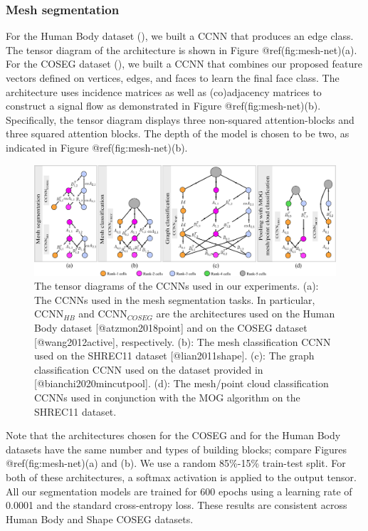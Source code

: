 \documentclass[
  12pt,
]{krantz}
\begin{document}
\subsubsection{Mesh segmentation}\label{mesh-segmentation}

For the Human Body dataset (), we built a CCNN that produces an edge class. The tensor
diagram of the architecture is shown in Figure @ref(fig:mesh-net)(a).
For the COSEG dataset (), we built a CCNN that combines our proposed feature vectors
defined on vertices, edges, and faces to learn the final face class. The
architecture uses incidence matrices as well as (co)adjacency matrices
to construct a signal flow as demonstrated in Figure
@ref(fig:mesh-net)(b). Specifically, the tensor diagram displays three
non-squared attention-blocks and three squared attention blocks. The
depth of the model is chosen to be two, as indicated in Figure
@ref(fig:mesh-net)(b).

\begin{figure}

{\centering \includegraphics{figures/experiment} 

}

\caption{The tensor diagrams of the CCNNs used in our experiments. (a): The CCNNs used in the mesh segmentation tasks. In particular, $\mbox{CCNN}_{HB}$ and $\mbox{CCNN}_{COSEG}$ are the architectures used on the Human Body dataset [@atzmon2018point] and on the COSEG dataset [@wang2012active], respectively. (b): The mesh classification CCNN used on the SHREC11 dataset [@lian2011shape]. (c): The graph classification CCNN used on the dataset provided in [@bianchi2020mincutpool]. (d): The mesh/point cloud classification CCNNs used in conjunction with the MOG algorithm on the SHREC11 dataset.}\label{fig:mesh-net}
\end{figure}

Note that the architectures chosen for the COSEG and for the Human Body
datasets have the same number and types of building blocks; compare
Figures @ref(fig:mesh-net)(a) and (b). We use a random 85\%-15\%
train-test split. For both of these architectures, a softmax activation
is applied to the output tensor. All our segmentation models are trained
for 600 epochs using a learning rate of 0.0001 and the standard
cross-entropy loss. These results are consistent across Human Body and
Shape COSEG datasets.
\end{document}
